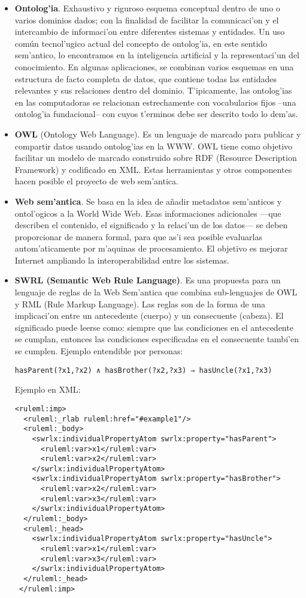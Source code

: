 \documentclass[11pt]{article}
\begin{document}
\begin{itemize}
\item \textbf{Ontolog'ia}. Exhaustivo y riguroso esquema conceptual dentro de uno o varios dominios dados; con la finalidad de facilitar la comunicaci'on y el intercambio de informaci'on entre diferentes sistemas y entidades. Un uso común tecnol'ugico actual del concepto de ontolog'ia, en este sentido sem'antico, lo encontramos en la inteligencia artificial y la representaci'un del conocimiento. En algunas aplicaciones, se combinan varios esquemas en una estructura de facto completa de datos, que contiene todas las entidades relevantes y sus relaciones dentro del dominio. T'ipicamente, las ontolog'ias en las computadoras se relacionan estrechamente con vocabularios fijos –una ontolog'ia fundacional– con cuyos t'erminos debe ser descrito todo lo dem'as.
\item \textbf{OWL} (Ontology Web Language). Es un lenguaje de marcado para publicar y compartir datos usando ontolog'ias en la WWW. OWL tiene como objetivo facilitar un modelo de marcado construido sobre RDF (Resource Description Framework) y codificado en XML. Estas herramientas y otros componentes hacen posible el proyecto de web sem'antica.
\item \textbf{Web sem'antica}. Se basa en la idea de añadir metadatos sem'anticos y ontol'ogicos a la World Wide Web. Esas informaciones adicionales —que describen el contenido, el significado y la relaci'un de los datos— se deben proporcionar de manera formal, para que as'i sea posible evaluarlas autom'aticamente por m'aquinas de procesamiento. El objetivo es mejorar Internet ampliando la interoperabilidad entre los sistemas.
\item \textbf{SWRL (Semantic Web Rule Language)}. Es una propuesta para un lenguaje de reglas de la Web Sem'antica que combina sub-lenguajes de OWL y RML (Rule Markup Language). Las reglas son de la forma de una implicaci'on entre un antecedente (cuerpo) y un consecuente (cabeza). El significado puede leerse como: siempre que las condiciones en el antecedente se cumplan, entonces las condiciones especificadas en el consecuente tambi'en se cumplen. Ejemplo entendible por personas:
\begin{verbatim}
hasParent(?x1,?x2) ∧ hasBrother(?x2,?x3) ⇒ hasUncle(?x1,?x3)
\end{verbatim}

Ejemplo en XML:

\begin{verbatim}
<ruleml:imp>
  <ruleml:_rlab ruleml:href="#example1"/>
  <ruleml:_body>
    <swrlx:individualPropertyAtom swrlx:property="hasParent">
      <ruleml:var>x1</ruleml:var>
      <ruleml:var>x2</ruleml:var>
    </swrlx:individualPropertyAtom>
    <swrlx:individualPropertyAtom swrlx:property="hasBrother">
      <ruleml:var>x2</ruleml:var>
      <ruleml:var>x3</ruleml:var>
    </swrlx:individualPropertyAtom>
  </ruleml:_body>
  <ruleml:_head>
    <swrlx:individualPropertyAtom swrlx:property="hasUncle">
      <ruleml:var>x1</ruleml:var>
      <ruleml:var>x3</ruleml:var>
    </swrlx:individualPropertyAtom>
  </ruleml:_head>
 </ruleml:imp>


\end{verbatim}
\end{itemize}
\end{document}
